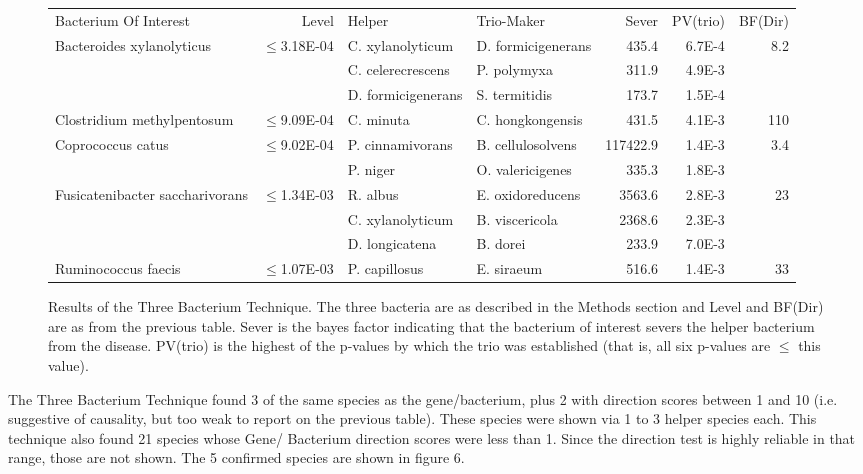 \documentclass[a4paper]{article}
\begin{document}
\begin{figure}[t]
  \begin{tabularx}{\textwidth}{lrllrrr}
Bacterium Of Interest & Level & Helper & Trio-Maker & Sever & PV(trio) & BF(Dir)\\
\hhline{=======}
Bacteroides xylanolyticus & $\leq$3.18E-04 & C. xylanolyticum & D.
formicigenerans &  435.4 & 6.7E-4 & 8.2 \\
\cline{3-6}
& & C. celerecrescens & P. polymyxa &  311.9 & 4.9E-3 &  \\
\cline{3-6}
& & D. formicigenerans & S. termitidis &  173.7 & 1.5E-4 &  \\
\cline{3-6}
Clostridium methylpentosum & $\leq$9.09E-04 &C. minuta & C. hongkongensis &  431.5 & 4.1E-3 & 110 \\
\cline{1-7}
Coprococcus catus & $\leq$9.02E-04 & P. cinnamivorans & B. cellulosolvens &  117422.9 & 1.4E-3 & 3.4 \\
\cline{3-6}
&  & P. niger & O. valericigenes &  335.3 & 1.8E-3 &  \\
\cline{1-7}
Fusicatenibacter saccharivorans & $\leq$1.34E-03 & R. albus & E. oxidoreducens &  3563.6 & 2.8E-3 & 23 \\
\cline{3-6}
& & C. xylanolyticum & B. viscericola &  2368.6 & 2.3E-3 &  \\
\cline{3-6}
& & D. longicatena & B. dorei &  233.9 & 7.0E-3 &  \\
\cline{1-7}
Ruminococcus faecis & $\leq$1.07E-03 & P. capillosus & E. siraeum &  516.6 & 1.4E-3 & 33 \\
\cline{1-7}
  \end{tabularx}
  \caption{Results of the Three Bacterium Technique.  The three
    bacteria are as described in the Methods section and Level and BF(Dir)
    are as from the previous table.  Sever is the bayes factor
    indicating that the bacterium of interest severs the helper
    bacterium from the disease.  PV(trio) is the highest of the
    p-values by which the trio was established (that is, all six
    p-values are $\leq$ this value).}
\end{figure}

The Three Bacterium Technique found 3 of the same species as the
gene/bacterium, plus 2 with direction scores between 1 and 10
(i.e. suggestive of causality, but too weak to report on the previous
table).  These species were shown via 1 to 3 helper species each.
This technique also found 21 species whose Gene/ Bacterium direction
scores were less than 1.  Since the direction test is highly reliable
in that range, those are not shown.  The 5 confirmed species are shown
in figure 6.
\end{document}

